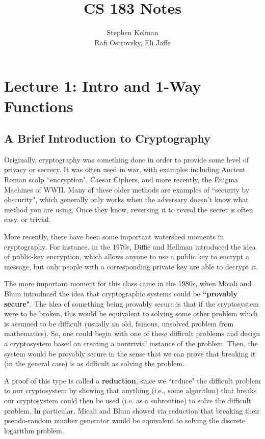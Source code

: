 \documentclass[11pt]{article}
\title{CS 183 Notes}
\author{Stephen Kelman\\ Rafi Ostrovsky, Eli Jaffe}
\begin{document}
\maketitle

\section{Lecture 1: Intro and 1-Way Functions}


\subsection{A Brief Introduction to Cryptography}

Originally, cryptography was something done in order to provide some level of privacy or secrecy. It was often used in war, with examples including Ancient Roman scalp ``encryption", Caesar Ciphers, and more recently, the Enigma Machines of WWII. Many of these older methods are examples of ``security by obscurity", which generally only works when the adversary doesn't know what method you are using. Once they know, reversing it to reveal the secret is often easy, or trivial.\medskip

More recently, there have been some important watershed moments in cryptography. For instance, in the 1970s, Diffie and Hellman introduced the idea of public-key encryption, which allows anyone to use a public key to encrypt a message, but only people with a corresponding private key are able to decrypt it.\medskip

The more important moment for this class came in the 1980s, when Micali and Blum introduced the idea that cryptographic systems could be \textbf{``provably secure"}. The idea of something being provably secure is that if the cryptosystem were to be broken, this would be equivalent to solving some other problem which is assumed to be difficult (usually an old, famous, unsolved problem from mathematics). So, one could begin with one of these difficult problems and design a cryptosystem based on creating a nontrivial instance of the problem. Then, the system would be provably secure in the sense that we can prove that breaking it (in the general case) is as difficult as solving the problem. 

A proof of this type is called a \textbf{reduction}, since we ``reduce" the difficult problem to our cryptosystem by showing that anything (i.e., some algorithm) that breaks our cryptosystem could then be used (i.e. as a subroutine) to solve the difficult problem. In particular, Micali and Blum showed via reduction that breaking their pseudo-random number generator would be equivalent to solving the discrete logarithm problem.\smallskip
\end{document}
